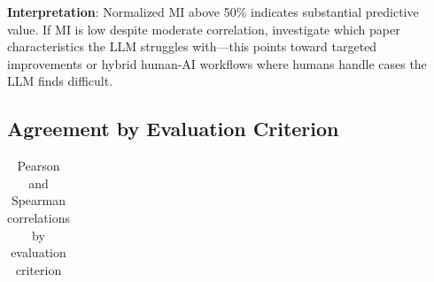 \documentclass[
  11pt,
  letterpaper,
  DIV=11,
  numbers=noendperiod]{scrreprt}
\begin{document}
\textbf{Interpretation}: Normalized MI above 50\% indicates substantial
predictive value. If MI is low despite moderate correlation, investigate
which paper characteristics the LLM struggles with---this points toward
targeted improvements or hybrid human-AI workflows where humans handle
cases the LLM finds difficult.

\subsection{Agreement by Evaluation
Criterion}\label{agreement-by-evaluation-criterion}

\begin{longtable}[]{@{}
  >{\raggedright\arraybackslash}p{}
  >{\raggedleft\arraybackslash}p{}
  >{\raggedleft\arraybackslash}p{}
  >{\raggedleft\arraybackslash}p{}
  >{\raggedleft\arraybackslash}p{}
  >{\raggedleft\arraybackslash}p{}@{}}

\caption{\label{tbl-agreement-by-criterion}Pearson and Spearman
correlations by evaluation criterion}

\tabularnewline


\end{longtable}
\end{document}
